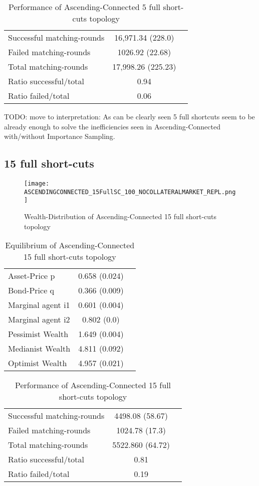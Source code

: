 \documentclass[Bachelorarbeit.tex]{subfiles}
\begin{document}
\begin{table}[H]
	\caption{Performance of Ascending-Connected 5 full short-cuts topology}
	\centering
	\begin{tabular} { l c r }
		\hline
		Successful matching-rounds& 16,971.34 (228.0) \\
		Failed matching-rounds & 1026.92 (22.68) \\
		Total matching-rounds & 17,998.26 (225.23) \\
		\hline
		Ratio successful/total & 0.94 \\
		Ratio failed/total & 0.06 \\
		\hline
	\end{tabular}
\end{table}

TODO: move to interpretation: As can be clearly seen 5 full shortcuts seem to be already enough to solve the inefficiencies seen in Ascending-Connected with/without Importance Sampling.

\subsection{15 full short-cuts}
\begin{figure}[H]
	\centering
  \texttt{[image: ASCENDINGCONNECTED\_15FullSC\_100\_NOCOLLATERALMARKET\_REPL.png]}
	\caption{Wealth-Distribution of Ascending-Connected 15 full short-cuts topology}
	\label{fig:wealth_ASCENDINGCONNECTED_15FullSC_100_NOCOLLATERALMARKET_REPL}
\end{figure}

\begin{table}[H]
	\caption{Equilibrium of Ascending-Connected 15 full short-cuts topology}
	\centering
	\begin{tabular} { l c r }
		\hline
		Asset-Price p & 0.658 (0.024) \\
		Bond-Price q & 0.366 (0.009) \\
		Marginal agent i1 & 0.601 (0.004) \\
		Marginal agent i2 & 0.802 (0.0) \\
		\hline
		Pessimist Wealth & 1.649 (0.004) \\
		Medianist Wealth & 4.811 (0.092) \\
		Optimist Wealth & 4.957 (0.021) \\
		\hline
	\end{tabular}
\end{table} 

\begin{table}[H]
	\caption{Performance of Ascending-Connected 15 full short-cuts topology}
	\centering
	\begin{tabular} { l c r }
		\hline
		Successful matching-rounds& 4498.08 (58.67) \\
		Failed matching-rounds & 1024.78 (17.3) \\
		Total matching-rounds & 5522.860 (64.72) \\
		\hline
		Ratio successful/total & 0.81 \\
		Ratio failed/total & 0.19 \\
		\hline
	\end{tabular}
\end{table}
\end{document}
